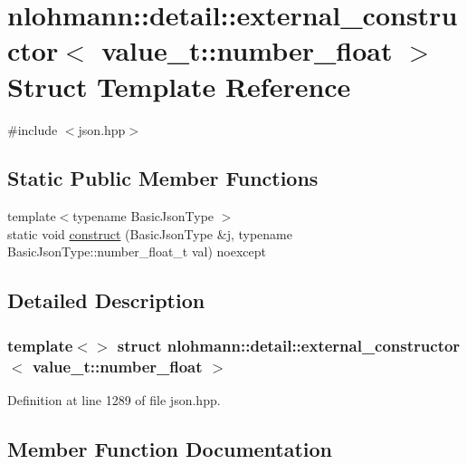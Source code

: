 \hypertarget{structnlohmann_1_1detail_1_1external__constructor_3_01value__t_1_1number__float_01_4}{}\section{nlohmann\+:\+:detail\+:\+:external\+\_\+constructor$<$ value\+\_\+t\+:\+:number\+\_\+float $>$ Struct Template Reference}
\label{structnlohmann_1_1detail_1_1external__constructor_3_01value__t_1_1number__float_01_4}


{\ttfamily \#include $<$json.\+hpp$>$}

\subsection*{Static Public Member Functions}
\begin{DoxyCompactItemize}
\item 
{\footnotesize template$<$typename Basic\+Json\+Type $>$ }\\static void \hyperlink{structnlohmann_1_1detail_1_1external__constructor_3_01value__t_1_1number__float_01_4_a669df5a4d258b588e67f747c6d656cdb}{construct} (Basic\+Json\+Type \&j, typename Basic\+Json\+Type\+::number\+\_\+float\+\_\+t val) noexcept
\end{DoxyCompactItemize}


\subsection{Detailed Description}
\subsubsection*{template$<$$>$\newline
struct nlohmann\+::detail\+::external\+\_\+constructor$<$ value\+\_\+t\+::number\+\_\+float $>$}



Definition at line 1289 of file json.\+hpp.



\subsection{Member Function Documentation}
\mbox{\label{structnlohmann_1_1detail_1_1external__constructor_3_01value__t_1_1number__float_01_4_a669df5a4d258b588e67f747c6d656cdb}} 
